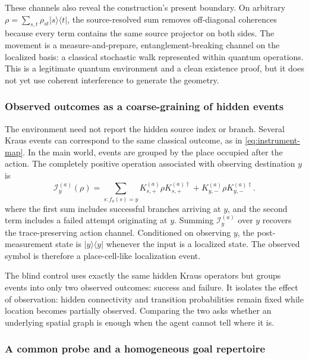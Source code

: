 \documentclass[11pt]{article}
\begin{document}
These channels also reveal the construction's present boundary. On arbitrary
$\rho=\sum_{s,t}\rho_{st}|s\rangle\!\langle t|$, the source-resolved sum
removes off-diagonal coherences because every term contains the same source
projector on both sides. The movement is a measure-and-prepare,
entanglement-breaking channel on the localized basis: a classical stochastic
walk represented within quantum operations. This is a legitimate quantum
environment and a clean existence proof, but it does not yet use coherent
interference to generate the geometry.

\subsubsection{Observed outcomes as a coarse-graining of hidden events}

The environment need not report the hidden source index or branch. Several
Kraus events can correspond to the same classical outcome, as in
\cref{eq:instrument-map}. In the main world, events are grouped by the place
occupied after the action. The completely positive operation associated with
observing destination $y$ is
\begin{equation}
 \mathcal I_y^{(a)}(\rho)
 =\sum_{s:f_a(s)=y}K_{s,+}^{(a)}\rho K_{s,+}^{(a)\dagger}
 +K_{y,-}^{(a)}\rho K_{y,-}^{(a)\dagger}.
 \label{eq:grouped-instrument}
\end{equation}
where the first sum includes successful branches arriving at $y$, and the
second term includes a failed attempt originating at $y$. Summing
$\mathcal I_y^{(a)}$ over $y$ recovers the trace-preserving action channel.
Conditioned on observing $y$, the post-measurement state is $|y\rangle\!\langle
y|$ whenever the input is a localized state. The observed symbol is therefore
a place-cell-like localization event.

The blind control uses exactly the same hidden Kraus operators but groups
events into only two observed outcomes: success and failure. It isolates the
effect of observation: hidden connectivity and transition probabilities remain
fixed while location becomes partially observed. Comparing the two asks
whether an underlying spatial graph is enough when the agent cannot tell where
it is.

\subsubsection{A common probe and a homogeneous goal repertoire}
\end{document}
